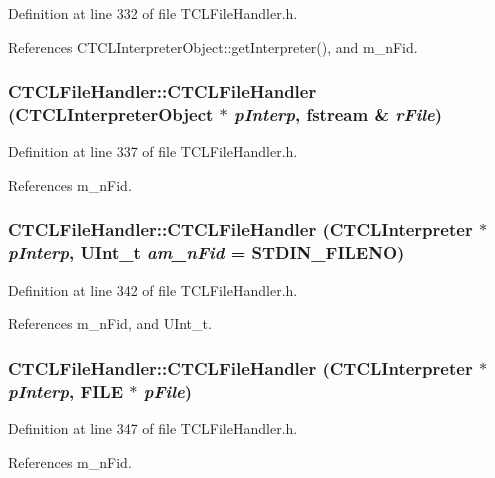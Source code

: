 Definition at line 332 of file TCLFile\-Handler.h.

References CTCLInterpreter\-Object::get\-Interpreter(), and m\_\-n\-Fid.
\subsubsection{\setlength{\rightskip}{0pt plus 5cm}CTCLFile\-Handler::CTCLFile\-Handler ({\bf CTCLInterpreter\-Object} $\ast$ {\em p\-Interp}, fstream \& {\em r\-File})\hspace{0.3cm}{\tt  [inline]}}\label{classCTCLFileHandler_a2}




Definition at line 337 of file TCLFile\-Handler.h.

References m\_\-n\-Fid.
\subsubsection{\setlength{\rightskip}{0pt plus 5cm}CTCLFile\-Handler::CTCLFile\-Handler ({\bf CTCLInterpreter} $\ast$ {\em p\-Interp}, {\bf UInt\_\-t} {\em am\_\-n\-Fid} = STDIN\_\-FILENO)\hspace{0.3cm}{\tt  [inline]}}\label{classCTCLFileHandler_a3}




Definition at line 342 of file TCLFile\-Handler.h.

References m\_\-n\-Fid, and UInt\_\-t.
\subsubsection{\setlength{\rightskip}{0pt plus 5cm}CTCLFile\-Handler::CTCLFile\-Handler ({\bf CTCLInterpreter} $\ast$ {\em p\-Interp}, FILE $\ast$ {\em p\-File})\hspace{0.3cm}{\tt  [inline]}}\label{classCTCLFileHandler_a4}




Definition at line 347 of file TCLFile\-Handler.h.

References m\_\-n\-Fid.
